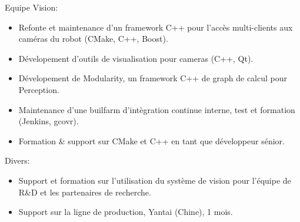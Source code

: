\documentclass{article}
\begin{document}
\begin{llist}
{\begin{itemize}
\end{itemize}
Equipe Vision:
\vspace{-0.50cm}
\begin{itemize}
	\item Refonte et maintenance d'un framework C++ pour l'acc\`{e}s multi-clients aux cam\'{e}ras du robot (CMake, C++, Boost).
	\item D\'{e}velopement d'outils de visualisation pour cameras (C++, Qt).
	\item D\'{e}velopement de Modularity, un framework C++ de graph de calcul pour Perception.
	\item Maintenance d'une builfarm d'int\`{e}gration continue interne, test et formation (Jenkins, gcovr).
	\item Formation \& support sur CMake et C++ en tant que d\'{e}veloppeur s\'{e}nior.
\end{itemize}
Divers:
\vspace{-0.50cm}
\begin{itemize}
	\item Support et formation sur l'utilisation du syst\`{e}me de vision pour l'\'{e}quipe de R\&D et les partenaires de recherche.
	\item Support sur la ligne de production, Yantai (Chine), 1 mois.
\end{itemize}
}


\end{llist}
\end{document}
